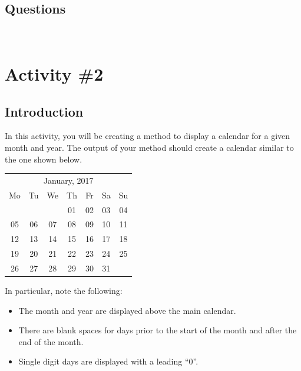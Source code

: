 		\subsection{Questions}
			\ \\[9pt]

	\pagebreak

	\section{Activity \#2}
		\subsection{Introduction}
			In this activity, you will be creating a method to display a calendar for a given month and year. The output of your method should create a calendar similar to the one shown below.
			\begin{center}
				\small
				\begin{tabular}{c c c c c c c}
					\multicolumn{7}{c}{January, 2017}\\
					Mo & Tu & We & Th & Fr & Sa & Su\\
					\ & \ & \ & 01 & 02 & 03 & 04 \\
					05 & 06 & 07 & 08 & 09 & 10 & 11 \\
					12 & 13 & 14 & 15 & 16 & 17 & 18 \\
					19 & 20 & 21 & 22 & 23 & 24 & 25 \\
					26 & 27 & 28 & 29 & 30 & 31
				\end{tabular}
			\end{center}
			In particular, note the following:
			\begin{itemize}
				\item The month and year are displayed above the main calendar.
				\item There are blank spaces for days prior to the start of the month and after the end of the month.
				\item Single digit days are displayed with a leading ``0''.
			\end{itemize}

